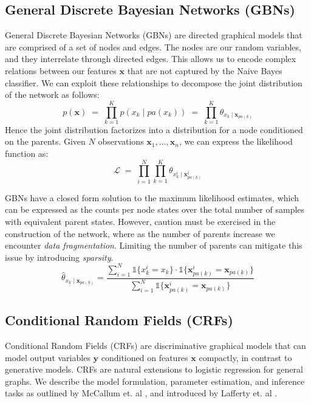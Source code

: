 \documentclass{article}
\begin{document}
\subsection{General Discrete Bayesian Networks (GBNs)}
\label{sec:GBN}
General Discrete Bayesian Networks (GBNs) are directed graphical models that are
comprised of a set of nodes and edges. The nodes are our random variables,
and they interrelate through directed edges. This allows us to
encode complex relations between our features $\mathbf{x}$ that are not
captured by the Naive Bayes classifier. We can exploit these relationships
to decompose the joint distribution of the network as follows:
\begin{equation}
  p(\mathbf{x}) \; = \; \prod_{k=1}^K p(x_k \mid pa(x_k)) \; = \; \prod_{k=1}^K \theta_{x_k \mid \mathbf{x}_{pa(k)}}
\end{equation}
Hence the joint distribution factorizes into a distribution for a node
conditioned on the parents.
Given $N$ observations $\mathbf{x}_1, \hdots, \mathbf{x}_n$, we can express
the likelihood function as:
\begin{equation}
  \mathcal{L} \; = \; \prod_{i=1}^{N} \prod_{k=1}^{K} \theta_{x_{k}^{i} \mid \mathbf{x}_{pa(k)}^{i}}
\end{equation}

GBNs have a closed form solution to the maximum likelihood estimates, which can
be expressed as the counts per node states over the total number of samples
with equivalent parent states. However, caution must be exercised in the
construction of the network, where as the number of parents increase we
encounter \textit{data fragmentation}. Limiting the number of parents can
mitigate this issue by introducing \textit{sparsity}.
\begin{equation}
  \hat{\theta}_{x_k \mid \mathbf{x}_{pa(k)}} = \frac{ \sum_{i=1}^{N} \mathds{1} \{ x_{k}^{i} = x_k \} \cdot \mathds{1} \{\mathbf{x}_{pa(k)}^{i} = \mathbf{x}_{pa(k)} \} }{ \sum_{i=1}^{N} \mathds{1} \{\mathbf{x}_{pa(k)}^{i} = \mathbf{x}_{pa(k)} \} }
\end{equation}
\subsection{Conditional Random Fields (CRFs)}
\label{sec:CRF}
Conditional Random Fields (CRFs) are discriminative graphical models that
can model output variables $\mathbf{y}$ conditioned on features $\mathbf{x}$
compactly, in contrast to generative models. CRFs are natural extensions
to logistic regression for general graphs. We describe the model formulation,
parameter estimation, and inference tasks as outlined by McCallum et. al \cite{McCallumCRF},
and introduced by Lafferty et. al \cite{CRF}.
\end{document}
